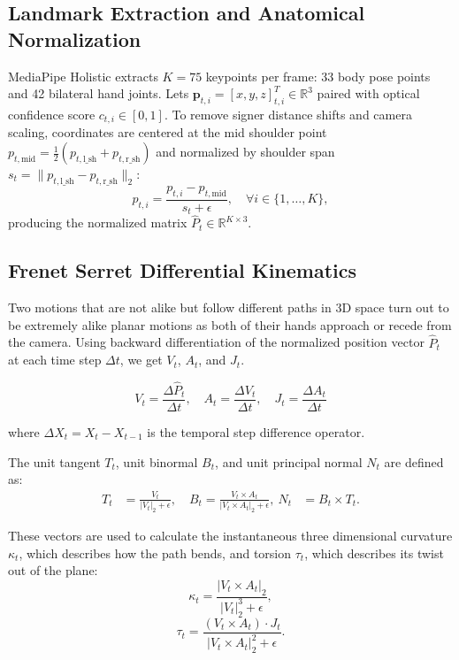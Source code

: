 \documentclass[conference]{IEEEtran}
\begin{document}
\subsection{Landmark Extraction and Anatomical Normalization}
MediaPipe Holistic extracts $K = 75$ keypoints per frame: 33 body pose points and 42 bilateral hand joints. Lets $\mathbf{p}_{t,i} = [x, y, z]_{t,i}^T \in \mathbb{R}^3$ paired with optical confidence score $c_{t,i} \in [0, 1]$. To remove signer distance shifts and camera scaling, coordinates are centered at the mid shoulder point $p_{t, \text{mid}} = \frac{1}{2}(p_{t, \text{l\_sh}} + p_{t, \text{r\_sh}})$ and normalized by shoulder span $s_t = \|p_{t, \text{l\_sh}} - p_{t, \text{r\_sh}}\|_2$:
\begin{equation}
\hat{p}_{t,i} = \frac{p_{t,i} - p_{t,\text{mid}}}{s_t + \epsilon}, \quad \forall i \in \{1, \ldots, K\},
\label{eq:norm_math}
\end{equation}
producing the normalized matrix $\hat{P}_t \in \mathbb{R}^{K \times 3}$.

\subsection{Frenet Serret Differential Kinematics}

Two motions that are not alike but follow different paths in 3D space turn out to be extremely alike planar motions as both of their hands approach or recede from the camera. Using backward differentiation of the normalized position vector $\hat{P}_t$ at each time step $\Delta t$, we get $V_t$, $A_t$, and $J_t$.

\begin{equation}
V_t = \frac{\Delta \hat{P}_t}{\Delta t}, \quad
A_t = \frac{\Delta V_t}{\Delta t}, \quad
J_t = \frac{\Delta A_t}{\Delta t}
\end{equation}

where $\Delta X_t = X_t - X_{t-1}$ is the temporal step difference operator.

The unit tangent $T_t$, unit binormal $B_t$, and unit principal normal $N_t$ are defined as:
\begin{equation}
\begin{aligned}
T_t &= \frac{V_t}{|V_t|_2 + \epsilon}, \quad B_t = \frac{V_t \times A_t}{|V_t \times A_t|_2 + \epsilon}, \
N_t &= B_t \times T_t.
\end{aligned}
\label{eq:frenet_frame}
\end{equation}

These vectors are used to calculate the instantaneous three dimensional curvature $\kappa_t$, which describes how the path bends, and torsion $\tau_t$, which describes its twist out of the plane:
\begin{equation}
\kappa_t = \frac{|V_t \times A_t|_2}{|V_t|_2^3 + \epsilon},
\label{eq:curvature_math}
\end{equation}
\begin{equation}
\tau_t = \frac{(V_t \times A_t) \cdot J_t}{|V_t \times A_t|_2^2 + \epsilon}.
\label{eq:torsion_math}
\end{equation}
\end{document}
